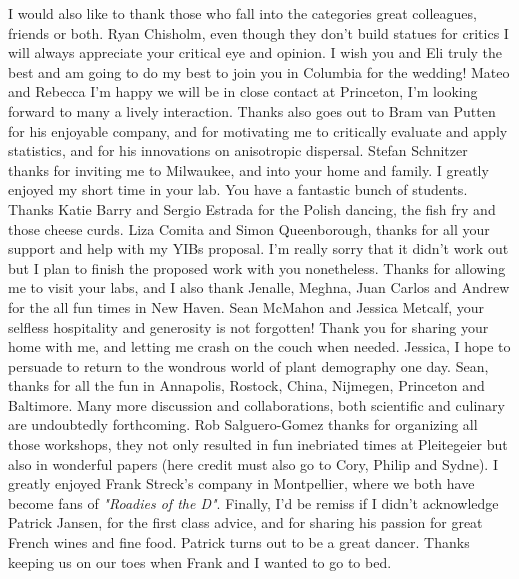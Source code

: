 \documentclass[b5paper,justified]{tufte-book} %
\begin{document}
\begin{fullwidth}
I would also like to thank those who fall into the categories great colleagues, friends or both. Ryan Chisholm, even though they don't build statues for critics I will always appreciate your critical eye and opinion. I wish you and Eli truly the best and am going to do my best to join you in Columbia for the wedding! Mateo and Rebecca I'm happy we will be in close contact at Princeton, I'm looking forward to many a lively interaction. Thanks also goes out to Bram van Putten for his enjoyable company, and for motivating me to critically evaluate and apply statistics, and for his innovations on anisotropic dispersal.  Stefan Schnitzer thanks for inviting me to Milwaukee, and into your home and family. I greatly enjoyed my short time in your lab. You have a fantastic bunch of students. Thanks Katie Barry and Sergio Estrada for the Polish dancing, the fish fry and those cheese curds. Liza Comita and Simon Queenborough, thanks for all your support and help with my YIBs proposal. I'm really sorry that it didn't work out but I plan to finish the proposed work with you nonetheless. Thanks for allowing me to visit your labs, and I also thank Jenalle, Meghna, Juan Carlos and Andrew for the all fun times in New Haven. Sean McMahon and Jessica Metcalf, your selfless hospitality and generosity is not forgotten! Thank you for sharing your home with me, and letting me crash on the couch when needed. Jessica, I hope to persuade to return to the wondrous world of plant demography one day. Sean, thanks for all the fun in Annapolis, Rostock, China, Nijmegen, Princeton and Baltimore.  Many more discussion and collaborations, both scientific and culinary are undoubtedly forthcoming.  Rob Salguero-Gomez thanks for organizing all those workshops, they not only resulted in fun inebriated times at Pleitegeier but also in wonderful papers (here credit must also go to Cory, Philip and Sydne). I greatly enjoyed Frank Streck's company in Montpellier, where we both have become fans of \textit{"Roadies of the D"}. Finally, I'd be remiss if I didn't acknowledge Patrick Jansen, for the first class advice, and for sharing his passion for great French wines and fine food. Patrick turns out to be a great dancer. Thanks keeping us on our toes when Frank and I wanted to go to bed. 


\end{fullwidth}
\end{document}
